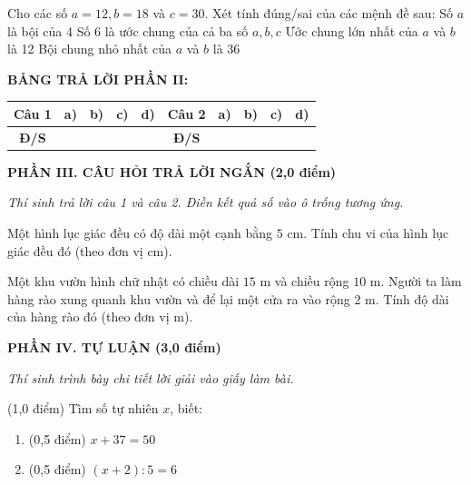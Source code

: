 \documentclass[12pt,a4paper]{article}
\begin{document}
\begin{ex}
Cho các số $a = 12, b = 18$ và $c = 30$. Xét tính đúng/sai của các mệnh đề sau:
\choiceTF
{\True Số $a$ là bội của 4}
{\True Số 6 là ước chung của cả ba số $a, b, c$}
{Ước chung lớn nhất của $a$ và $b$ là 12}
{\True Bội chung nhỏ nhất của $a$ và $b$ là 36}
\end{ex}


\noindent\textbf{BẢNG TRẢ LỜI PHẦN II:}
\begin{center}
\begin{tabular}{|c|c|c|c|c||c|c|c|c|c|}
\hline
\textbf{Câu 1} & \textbf{a)} & \textbf{b)} & \textbf{c)} & \textbf{d)} & \textbf{Câu 2} & \textbf{a)} & \textbf{b)} & \textbf{c)} & \textbf{d)} \\
\hline
\textbf{Đ/S} & \rule{0pt}{0.6cm} & & & & \textbf{Đ/S} & & & & \\
\hline
\end{tabular}
\end{center}
\vspace{2mm}

\setcounter{ex}{0}
\noindent\textbf{\large PHẦN III. CÂU HỎI TRẢ LỜI NGẮN (2,0 điểm)}

\textit{Thí sinh trả lời câu 1 và câu 2. Điền kết quả số vào ô trống tương ứng.}

\vspace{1mm}
\begin{ex}
Một hình lục giác đều có độ dài một cạnh bằng $5\text{ cm}$. Tính chu vi của hình lục giác đều đó (theo đơn vị $\text{cm}$). 
\end{ex}

\begin{ex}
Một khu vườn hình chữ nhật có chiều dài $15\text{ m}$ và chiều rộng $10\text{ m}$. Người ta làm hàng rào xung quanh khu vườn và để lại một cửa ra vào rộng $2\text{ m}$. Tính độ dài của hàng rào đó (theo đơn vị $\text{m}$). 
\end{ex}


\setcounter{ex}{0}
\noindent\textbf{\large PHẦN IV. TỰ LUẬN (3,0 điểm)}

\textit{Thí sinh trình bày chi tiết lời giải vào giấy làm bài.}

\vspace{1mm}
\begin{ex} (1,0 điểm)
Tìm số tự nhiên $x$, biết:
\begin{enumerate}[label=\textbf{\alph*)}, leftmargin=0.8cm, itemsep=2pt]
\item (0,5 điểm) $x + 37 = 50$
\item (0,5 điểm) $(x + 2) : 5 = 6$
\end{enumerate}
\end{ex}
\vspace{1.5mm}
\end{document}
